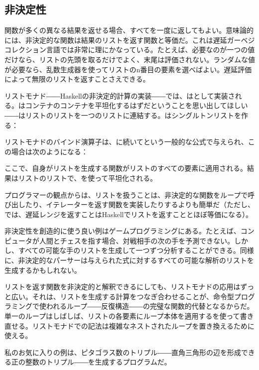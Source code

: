 \subsection{非決定性}

関数が多くの異なる結果を返せる場合、すべてを一度に返してもよい。意味論的には、非決定的な関数は結果のリストを返す関数と等価だ。これは遅延ガーベジコレクション言語では非常に理にかなっている。たとえば、必要なのが一つの値だけなら、リストの先頭を取るだけでよく、末尾は評価されない。ランダムな値が必要なら、乱数生成器を使ってリストのn番目の要素を選べばよい。遅延評価によって無限のリストを返すことさえできる。

リストモナド――Haskellの非決定的計算の実装――では、はとして実装される。はコンテナのコンテナを平坦化するはずだということを思い出してほしい――はリストのリストを一つのリストに連結する。はシングルトンリストを作る：

リストモナドのバインド演算子は、に続いてという一般的な公式で与えられ、この場合は次のようになる：

ここで、自身がリストを生成する関数がリストのすべての要素に適用される。結果はリストのリストで、を使って平坦化される。

プログラマーの観点からは、リストを扱うことは、非決定的な関数をループで呼び出したり、イテレーターを返す関数を実装したりするよりも簡単だ（ただし、では、遅延レンジを返すことはHaskellでリストを返すこととほぼ等価になる）。

非決定性を創造的に使う良い例はゲームプログラミングにある。たとえば、コンピュータが人間とチェスを指す場合、対戦相手の次の手を予測できない。しかし、すべての可能な手のリストを生成して一つずつ分析することができる。同様に、非決定的なパーサーは与えられた式に対するすべての可能な解析のリストを生成するかもしれない。

リストを返す関数を非決定的と解釈できるにしても、リストモナドの応用はずっと広い。それは、リストを生成する計算をつなぎ合わせることが、命令型プログラミングで使われるループ――反復構造――の完璧な関数的代替となるからだ。単一のループはしばしば、リストの各要素にループ本体を適用するを使って書き直せる。リストモナドでの記法は複雑なネストされたループを置き換えるために使える。

私のお気に入りの例は、ピタゴラス数のトリプル――直角三角形の辺を形成できる正の整数のトリプル――を生成するプログラムだ。

